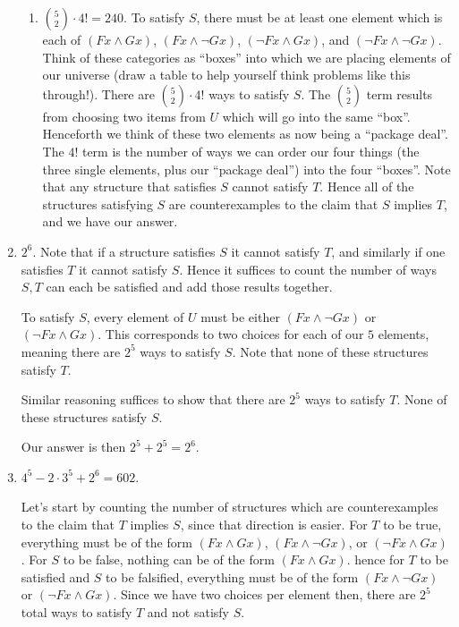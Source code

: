 \begin{mdframed}[linewidth=1]
\begin{enumerate}
\begin{enumerate}
        \item $\binom{5}{2}\cdot 4! = 240$. To satisfy $S$, there must be at least one element which is each of $(Fx \land Gx)$, $(Fx \land \lnot Gx)$, $(\lnot Fx \land Gx)$, and $(\lnot Fx \land \lnot Gx)$. Think of these categories as ``boxes'' into which we are placing elements of our universe (draw a table to help yourself think problems like this through!). There are $\binom{5}{2}\cdot 4!$ ways to satisfy $S$. The $\binom{5}{2}$ term results from choosing two items from $U$ which will go into the same ``box''. Henceforth we think of these two elements as now being a ``package deal''. The $4!$ term is the number of ways we can order our four things (the three single elements, plus our ``package deal'') into the four ``boxes''. Note that any structure that satisfies $S$ cannot satisfy $T$. Hence all of the structures satisfying $S$ are counterexamples to the claim that $S$ implies $T$, and we have our answer. 
    \end{enumerate}

    \item $2^6$. Note that if a structure satisfies $S$ it cannot satisfy $T$, and similarly if one satisfies $T$ it cannot satisfy $S$. Hence it suffices to count the number of ways $S, T$ can each be satisfied and add those results together.

    To satisfy $S$, every element of $U$ must be either $(Fx \land \lnot Gx)$ or $(\lnot Fx \land Gx)$. This corresponds to two choices for each of our $5$ elements, meaning there are $2^5$ ways to satisfy $S$. Note that none of these structures satisfy $T$.

    Similar reasoning suffices to show that there are $2^5$ ways to satisfy $T$. None of these structures satisfy $S$.

    Our answer is then $2^5 + 2^5 = 2^6$. 

    \item $4^5 - 2\cdot 3^5 + 2^6 = 602$. 

    Let's start by counting the number of structures which are counterexamples to the claim that $T$ implies $S$, since that direction is easier. For $T$ to be true, everything must be of the form $(Fx \land Gx)$, $(Fx \land \lnot Gx)$, or $(\lnot Fx \land Gx)$. For $S$ to be false, nothing can be of the form $(Fx \land Gx)$. hence for $T$ to be satisfied and $S$ to be falsified, everything must be of the form $(Fx \land \lnot Gx)$ or $(\lnot Fx \land Gx)$. Since we have two choices per element then, there are $2^5$ total ways to satisfy $T$ and not satisfy $S$. 


\end{enumerate}
\end{mdframed}
